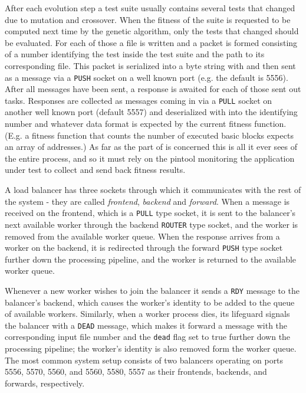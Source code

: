 After each evolution step a test suite usually contains several tests that changed due to mutation and
crossover. When the fitness of the suite is requested to be computed next time by the genetic algorithm, 
only the tests that changed should be evaluated. For each of those a file is written and a packet is 
formed consisting of a number identifying the test inside the test suite and the path to its corresponding 
file. This packet is serialized into a byte string with \msgpack and then sent as a \zmq message via a 
\texttt{PUSH} socket on a well known port (e.g. the default is 5556). After all messages have been sent,
a response is awaited for each of those sent out tasks. Responses are collected as \zmq messages coming 
in via a \texttt{PULL} socket on another well known port (default 5557) and deserialized with \msgpack 
into the identifying number and whatever data format is expected by the current fitness function. 
(E.g. a fitness function that counts the number of executed basic blocks expects an array of addresses.)
As far as the \java part of \xmlmate is concerned this is all it ever sees of the entire process, and so it 
must rely on the pintool monitoring the application under test to collect and send back fitness results.

A load balancer has three \zmq sockets through which it communicates with the rest of the system - they are
called \emph{frontend}, \emph{backend} and \emph{forward}. When a message is received on the frontend,
which is a \texttt{PULL} type socket, it is sent to the balancer's next available worker through
the backend \texttt{ROUTER} type socket, and the worker is removed from the available worker queue. When the
response arrives from a worker on the backend, it is redirected through the forward \texttt{PUSH} type socket
further down the processing pipeline, and the worker is returned to the available worker queue. 

Whenever a new worker wishes to join the balancer it sends a \texttt{RDY} message to the balancer's backend,
which causes the worker's identity to be added to the queue of available workers. Similarly, when a worker
process dies, its lifeguard signals the balancer with a \texttt{DEAD} message, which makes it forward a
message with the corresponding input file number and the \texttt{dead} flag set to true further down the
processing pipeline; the worker's identity is also removed form the worker queue. The most common system setup
consists of two balancers operating on ports 5556, 5570, 5560, and 5560, 5580, 5557 as their frontends,
backends, and forwards, respectively.

